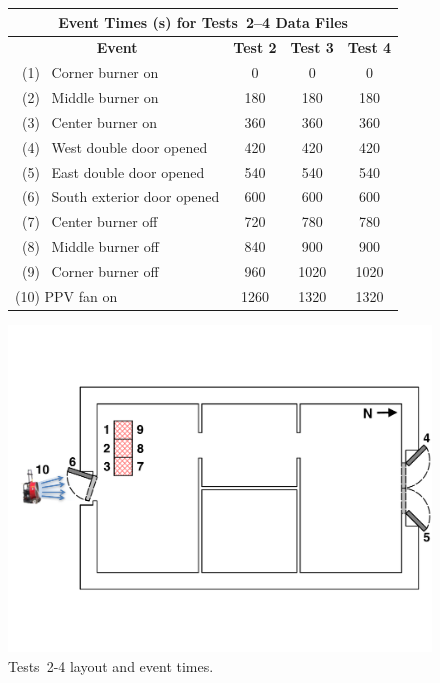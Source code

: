 \documentclass[12pt,oneside]{book}
\begin{document}
\begin{figure}[!ht]
\begin{minipage}[b]{0.8\columnwidth}
	\begin{flushleft}
	\begin{tabular}{lccc}
	\multicolumn{4}{c}{\normalsize Event Times (s) for Tests~2--4 Data Files} \\
	\toprule
	\multicolumn{1}{c}{\textbf{Event}} 	& \textbf{Test 2} & \textbf{Test 3} & \textbf{Test 4} \\
	\midrule
	~(1)~ Corner burner on 				& 	0		  	  &	 	0			&		0		  \\
	~(2)~ Middle burner on 				&   180			  &		180			&		180		  \\
	~(3)~ Center burner on 				&   360			  &	   	360			&	   	360		  \\
	~(4)~ West double door opened 		&   420			  &    	420			&	   	420		  \\
	~(5)~ East double door opened 		&   540			  &    	540			&	   	540		  \\
	~(6)~ South exterior door opened 	&   600			  &    	600			&	   	600		  \\
	~(7)~ Center burner off				&   720			  &    	780			&	   	780		  \\
	~(8)~ Middle burner off				&   840			  &    	900			&	   	900		  \\
	~(9)~ Corner burner off				&   960			  &    	1020		&	   	1020	  \\
	(10) PPV fan on 					& 	1260		  &    	1320		&  	   	1320	  \\	
	\bottomrule
	\end{tabular}
	\end{flushleft}
\end{minipage}
\begin{minipage}[b]{0.9\columnwidth}
	\vspace{15pt}
	\centering
	\includegraphics[width=\columnwidth]{../Figures/Floor_Plans/East_Structure_Test_4}
\end{minipage}
\caption{Tests~2-4 layout and event times.}
\label{fig:Tests_2-4_layout}
\end{figure}
\clearpage
\end{document}

